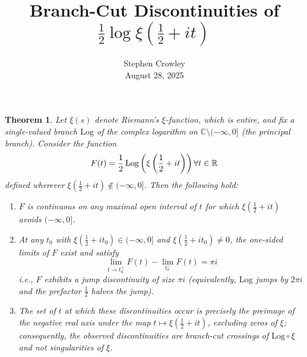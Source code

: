 \documentclass{article}
\newcommand{\nin}{\not\in}
\newcommand{\tmaffiliation}[1]{\\ #1}
\newtheorem{theorem}{Theorem}
\begin{document}
{\cdot}\title{Branch-Cut Discontinuities of $\frac{1}{2} \log \xi \left(
\frac{1}{2} + it \right)$}

\author{
  Stephen Crowley
  \tmaffiliation{August 28, 2025}
}

\maketitle

\begin{theorem}
  \label{thm:branch_cut_discontinuities}Let $\xi (s)$ denote Riemann's
  $\xi$-function, which is entire, and fix a single-valued branch
  $\mathrm{Log}$ of the complex logarithm on $\mathbb{C} \setminus (- \infty,
  0]$ (the principal branch). Consider the function
  \begin{equation}
    F (t) = \frac{1}{2} \hspace{0.17em} \mathrm{Log} \left( \xi \left(
    \frac{1}{2} + it \right) \right) \forall t \in \mathbb{R}
  \end{equation}
  defined wherever $\xi \left( \frac{1}{2} + it \right) \nin (- \infty, 0]$.
  Then the following hold:
  \begin{enumerate}
    \item \label{item:continuity} $F$ is continuous on any maximal open
    interval of $t$ for which $\xi \left( \frac{1}{2} + it \right)$ avoids $(-
    \infty, 0]$.
    
    \item \label{item:jump_discontinuity} At any $t_0$ with $\xi \left(
    \frac{1}{2} + it_0 \right) \in (- \infty, 0]$ and $\xi \left( \frac{1}{2}
    + it_0 \right) \neq 0$, the one-sided limits of $F$ exist and satisfy
    \begin{equation}
      \lim_{t \to t_0^+} F (t) - \lim_{t_0^-} F (t) = \pi i
    \end{equation}
    i.e., $F$ exhibits a jump discontinuity of size $\pi i$ (equivalently,
    $\mathrm{Log}$ jumps by $2 \pi i$ and the prefactor $\frac{1}{2}$ halves
    the jump).
    
    \item \label{item:characterization} The set of $t$ at which these
    discontinuities occur is precisely the preimage of the negative real axis
    under the map $t \mapsto \xi \left( \frac{1}{2} + it \right)$, excluding
    zeros of $\xi$; consequently, the observed discontinuities are branch-cut
    crossings of $\mathrm{Log} \circ \xi$ and not singularities of $\xi$.
  \end{enumerate}
\end{theorem}
\end{document}
